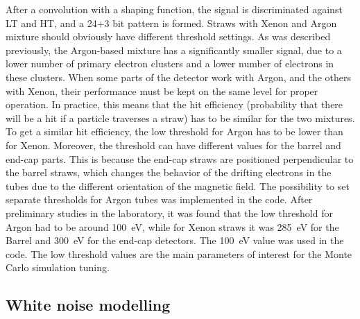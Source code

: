 After a convolution with a shaping function, the signal is discriminated against LT and HT, and a 24+3 bit pattern is formed.
Straws with Xenon and Argon mixture should obviously have different threshold settings.
As was described previously, the Argon-based mixture has a significantly smaller signal, due to a lower number of primary electron clusters and a lower number of electrons in these clusters.
When some parts of the detector work with Argon, and the others with Xenon, their performance must be kept on the same level for
proper operation. In practice, this means that the hit efficiency (probability that there will be a hit if a particle traverses a straw) has to be similar for the two mixtures. 
To get a similar hit efficiency, the low threshold for Argon has to be lower than for Xenon.
Moreover, the threshold can have different values for the barrel and end-cap parts. This is because the end-cap straws are positioned perpendicular to the barrel straws,
which changes the behavior of the drifting electrons in the tubes due to the different orientation of the magnetic field.
The possibility to set separate thresholds for Argon tubes was implemented in the code.
After preliminary studies in the laboratory, it was found that the low threshold for Argon had to be around 100~eV, 
while for Xenon straws it was 285~eV for the Barrel and 300~eV for the end-cap detectors. The 100~eV value was used in the code.
The low threshold values are the main parameters of interest for the Monte Carlo simulation tuning.

\subsection{White noise modelling}

